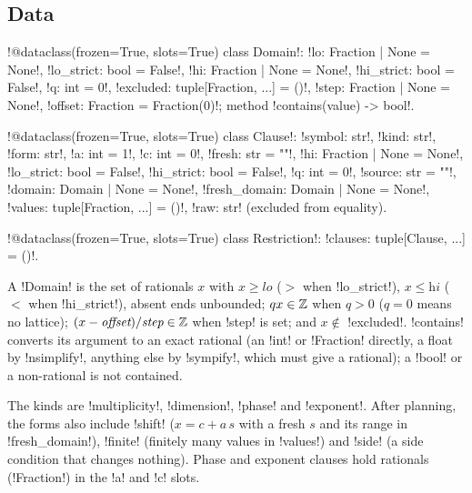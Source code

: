 \subsection{Data}

\begin{signature}
\py!@dataclass(frozen=True, slots=True) class Domain!: \py!lo: Fraction | None = None!, \py!lo_strict: bool = False!, \py!hi: Fraction | None = None!, \py!hi_strict: bool = False!, \py!q: int = 0!, \py!excluded: tuple[Fraction, ...] = ()!, \py!step: Fraction | None = None!, \py!offset: Fraction = Fraction(0)!; method \py!contains(value) -> bool!.

\py!@dataclass(frozen=True, slots=True) class Clause!: \py!symbol: str!, \py!kind: str!, \py!form: str!, \py!a: int = 1!, \py!c: int = 0!, \py!fresh: str = ""!, \py!hi: Fraction | None = None!, \py!lo_strict: bool = False!, \py!hi_strict: bool = False!, \py!q: int = 0!, \py!source: str = ""!, \py!domain: Domain | None = None!, \py!fresh_domain: Domain | None = None!, \py!values: tuple[Fraction, ...] = ()!, \py!raw: str! (excluded from equality).

\py!@dataclass(frozen=True, slots=True) class Restriction!: \py!clauses: tuple[Clause, ...] = ()!.
\end{signature}

\begin{definition}[Domain]\label{def:semantics-domain}
A \py!Domain! is the set of rationals $x$ with $x\ge\textit{lo}$ ($>$ when \py!lo_strict!), $x\le\textit{hi}$ ($<$ when \py!hi_strict!), absent ends unbounded; $qx\in\mathbb{Z}$ when $q>0$ ($q=0$ means no lattice); $(x-\textit{offset})/\textit{step}\in\mathbb{Z}$ when \py!step! is set; and $x\notin$ \py!excluded!. \py!contains! converts its argument to an exact rational (an \py!int! or \py!Fraction! directly, a float by \py!nsimplify!, anything else by \py!sympify!, which must give a rational); a \py!bool! or a non-rational is not contained.
\end{definition}

The kinds are \code!multiplicity!, \code!dimension!, \code!phase! and \code!exponent!. After planning, the forms also include \code!shift! ($x=c+a\,s$ with a fresh $s$ and its range in \py!fresh_domain!), \code!finite! (finitely many values in \py!values!) and \code!side! (a side condition that changes nothing). Phase and exponent clauses hold rationals (\py!Fraction!) in the \py!a! and \py!c! slots.

